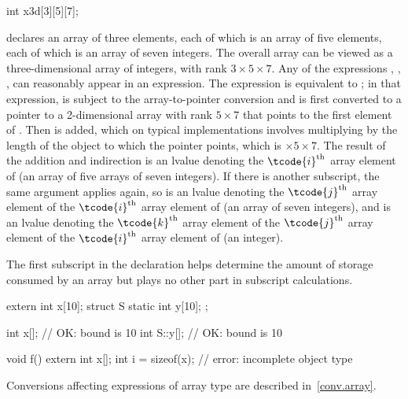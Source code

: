 \pnum
\begin{example}
\begin{codeblock}
int x3d[3][5][7];
\end{codeblock}
declares an array of three elements,
each of which is an array of five elements,
each of which is an array of seven integers.
The overall array can be viewed as a
three-dimensional array of integers,
with rank $3 \times 5 \times 7$.
Any of the expressions
,
,
,
can reasonably appear in an expression.
The expression
is equivalent to
;
in that expression,
is subject to the array-to-pointer conversion
and is first converted to
a pointer to a 2-dimensional
array with rank
$5 \times 7$
that points to the first element of .
Then  is added,
which on typical implementations involves multiplying
 by the
length of the object to which the pointer points,
which is $ \times 5 \times 7$.
The result of the addition and indirection is
an lvalue denoting
the $\tcode{i}^\text{th}$ array element of
(an array of five arrays of seven integers).
If there is another subscript,
the same argument applies again, so
 is
an lvalue denoting
the $\tcode{j}^\text{th}$ array element of
the $\tcode{i}^\text{th}$ array element of
(an array of seven integers), and
 is
an lvalue denoting
the $\tcode{k}^\text{th}$ array element of
the $\tcode{j}^\text{th}$ array element of
the $\tcode{i}^\text{th}$ array element of
(an integer).
\end{example}
\begin{note}
The first subscript in the declaration helps determine
the amount of storage consumed by an array
but plays no other part in subscript calculations.
\end{note}

\pnum
\begin{example}
\begin{codeblock}
extern int x[10];
struct S {
  static int y[10];
};

int x[];                // OK: bound is 10
int S::y[];             // OK: bound is 10

void f() {
  extern int x[];
  int i = sizeof(x);    // error: incomplete object type
}
\end{codeblock}
\end{example}

\pnum
\begin{note}
Conversions affecting expressions of array type are described in~\ref{conv.array}.
\end{note}

